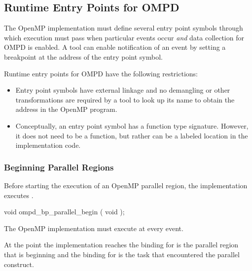 \subsection{Runtime Entry Points for OMPD}
\label{subsec:runtime-entry-points-for-ompd}

The OpenMP implementation must define several entry point symbols 
through which execution must pass when particular events occur
\emph{and} data collection for OMPD is enabled. A tool can enable
notification of an event by setting a breakpoint at the address of 
the entry point symbol.

\restrictions
Runtime entry points for OMPD have the following restrictions:
\begin{itemize}
\item Entry point symbols have external  linkage and no
demangling or other transformations are required by a tool
to look up its name to obtain the address in the OpenMP program.

\item Conceptually, an entry point symbol has a function type signature.
However, it does not need to be a function, but rather can be a labeled location
in the implementation code.
\end{itemize}



\subsubsection{Beginning Parallel Regions}
\label{subsubsec:ompd_bp_parallel_begin}

\summary

Before starting the execution of an OpenMP parallel region, the implementation executes
.

\format
\begin{cspecific}
\begin{ompSyntax}
void ompd_bp_parallel_begin ( void );
\end{ompSyntax}
\end{cspecific}


\descr

The OpenMP implementation must execute 
 at every  event.

At the point the implementation reaches 
the binding for  is the parallel 
region that is beginning and 
the binding for 
is the task that encountered the parallel construct.


